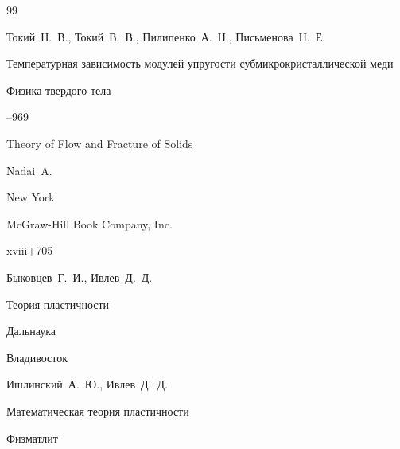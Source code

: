 \begin{thebibliography}{99}

\by  Токий~Н.~В.,  Токий~В.~В.,  Пилипенко~А.~Н.,  Письменова~Н.~Е.

\paper Температурная зависимость модулей упругости субмикрокристаллической меди 

\jour Физика твердого тела 




--969







\book Theory of Flow and Fracture of Solids 


\by  Nadai~A.

\publaddr New York

\publ McGraw-Hill Book Company, Inc.


\totalpages  xviii+705






\by Быковцев~Г.~И., Ивлев~Д.~Д. 

\book Теория пластичности


\publ Дальнаука

\publaddr Владивосток













\by Ишлинский~А.~Ю., Ивлев~Д.~Д.

\book Математическая теория пластичности


\publ Физматлит


\end{thebibliography}
